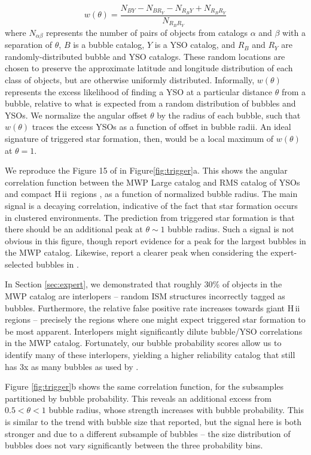 \documentclass[preprint]{aastex}
\newcommand{\hii}[0]{{\sc H\,ii}}
\begin{document}
\begin{equation}
w(\theta) = \frac{N_{BY} - N_{BR_Y} - N_{R_BY} + N_{R_BR_Y}}{N_{R_BR_Y}}
\label{eq:corr}
\end{equation}
where $N_{\alpha \beta}$ represents the number of pairs of objects from catalogs $\alpha$ and $\beta$ with a separation of $\theta$, $B$ is a bubble catalog, $Y$ is a YSO catalog, and $R_B$ and $R_Y$ are randomly-distributed bubble and YSO catalogs. These random locations are chosen to preserve the approximate latitude and longitude distribution of each class of objects, but are otherwise uniformly distributed. Informally, $w(\theta)$ represents the excess likelihood of finding a YSO at a particular distance $\theta$ from a bubble, relative to what is expected from a random distribution of bubbles and YSOs. We normalize the angular offset $\theta$ by the radius of each bubble, such that $w(\theta)$ traces the excess YSOs as a function of offset in bubble radii. An ideal signature of triggered star formation, then, would be a local maximum of $w(\theta)$ at $\theta = 1$. 

We reproduce the Figure 15 of \cite{Kendrew12} in Figure\ref{fig:trigger}a. This shows the angular correlation function between the MWP Large catalog and RMS catalog of YSOs and compact \hii\, regions \citep{RMS}, as a function of normalized bubble radius. The main signal is a decaying correlation, indicative of the fact that star formation occurs in clustered environments. The prediction from triggered star formation is that there should be an additional peak at $\theta \sim 1$ bubble radius. Such a signal is not obvious in this figure, though \cite{Kendrew12} report evidence for a peak for the largest bubbles in the MWP catalog. Likewise, \cite{Thompson12} report a clearer peak when considering the expert-selected bubbles in \cite{Churchwell06}. 

In Section \ref{sec:expert}, we demonstrated that roughly 30\% of objects in the MWP catalog are interlopers -- random ISM structures incorrectly tagged as bubbles. Furthermore, the relative false positive rate increases towards giant \hii\, regions -- precisely the regions where one might expect triggered star formation to be most apparent. Interlopers might significantly dilute bubble/YSO correlations in the MWP catalog. Fortunately, our bubble probability scores allow us to identify many of these interlopers, yielding a higher reliability catalog that still has 3x as many bubbles as used by \cite{Thompson12}.

Figure \ref{fig:trigger}b shows the same correlation function, for the subsamples partitioned by bubble probability. This reveals an additional excess from $0.5 < \theta < 1$ bubble radius, whose strength increases with bubble probability. This is similar to the trend with bubble size that \cite{Kendrew12} reported, but the signal here is both stronger and due to a different subsample of bubbles -- the size distribution of bubbles does not vary significantly between the three probability bins.
\end{document}
